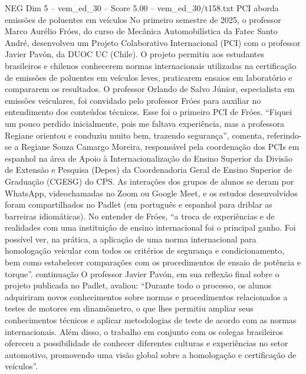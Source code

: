\begin{textsample}{NEG Dim 5 – vem\_ed\_30 – Score 5.00 – vem\_ed\_30/t158.txt}  \label{ex:f5_neg_140}
PCI aborda emissões de poluentes em veículos No primeiro semestre de 2025, o professor Marco Aurélio Fróes, do curso de Mecânica Automobilística da Fatec Santo André, desenvolveu um Projeto Colaborativo Internacional (PCI) com o professor Javier Pavón, da DUOC UC (Chile).
O projeto permitiu aos estudantes brasileiros e chilenos conhecerem normas internacionais utilizadas na certificação de emissões de poluentes em veículos leves, praticarem ensaios em laboratório e compararem os resultados.
O professor Orlando de Salvo Júnior, especialista em emissões veiculares, foi convidado pelo professor Fróes para auxiliar no entendimento dos conteúdos técnicos.
Esse foi o primeiro PCI de Fróes. “Fiquei um pouco perdido inicialmente, pois me faltava experiência, mas a professora Regiane orientou e conduziu muito bem, trazendo segurança”, comenta, referindo-se a Regiane Souza Camargo Moreira, responsável pela coordenação dos PCIs em espanhol na área de Apoio à Internacionalização do Ensino Superior da Divisão de Extensão e Pesquisa (Depes) da Coordenadoria Geral de Ensino Superior de Graduação (CGESG) do CPS.
As interações dos grupos de alunos se deram por WhatsApp, videochamadas no Zoom ou Google Meet, e os estudos desenvolvidos foram compartilhados no Padlet (em português e espanhol para driblar as barreiras idiomáticas).
No entender de Fróes, “a troca de experiências e de realidades com uma instituição de ensino internacional foi o principal ganho.
Foi possível ver, na prática, a aplicação de uma norma internacional para homologação veicular com todos os critérios de segurança e condicionamento, bem como estabelecer comparações com os procedimentos de ensaio de potência e torque”. continuação O professor Javier Pavón, em sua reflexão final sobre o projeto publicada no Padlet, avaliou: “Durante todo o processo, os alunos adquiriram novos conhecimentos sobre normas e procedimentos relacionados a testes de motores em dinamômetro, o que lhes permitiu ampliar seus conhecimentos técnicos e aplicar metodologias de teste de acordo com as normas internacionais.
Além disso, o trabalho em conjunto com os colegas brasileiros ofereceu a possibilidade de conhecer diferentes culturas e experiências no setor automotivo, promovendo uma visão global sobre a homologação e certificação de veículos”.

\end{textsample}

